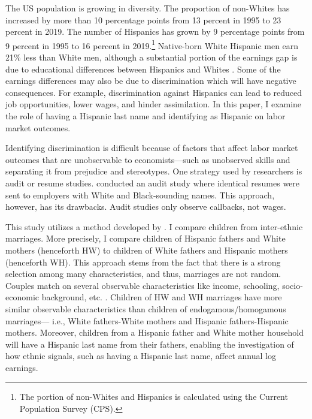 \documentclass[12pt,english]{article}
\begin{document}
The US population is growing in diversity. The proportion of non-Whites has increased by more than 10 percentage points from 13 percent in 1995 to 23 percent in 2019. The number of Hispanics has grown by 9 percentage points from 9 percent in 1995 to 16 percent in 2019.\footnote{The portion of non-Whites and Hispanics is calculated using the Current Population Survey (CPS).} Native-born White Hispanic men earn 21\% less than White men, although a substantial portion of the earnings gap is due to educational differences between Hispanics and Whites \autocite{duncan2006hispanics, duncan2018identifying, duncan2018socioeconomic}. Some of the earnings differences may also be due to discrimination which will have negative consequences. For example, discrimination against Hispanics can lead to reduced job opportunities, lower wages, and hinder assimilation. In this paper, I examine the role of having a Hispanic last name and identifying as Hispanic on labor market outcomes. 

Identifying discrimination is difficult because of factors that affect labor market outcomes that are unobservable to economists---such as unobserved skills and separating it from prejudice and stereotypes. One strategy used by researchers is audit or resume studies. \textcite{bertrand2004emily} conducted an audit study where identical resumes were sent to employers with White and Black-sounding names. This approach, however, has its drawbacks. Audit studies only observe callbacks, not wages. 

This study utilizes a method developed by \textcite{rubinstein2014pride}. I compare children from inter-ethnic marriages. More precisely, I compare children of Hispanic fathers and White mothers (henceforth HW) to children of White fathers and Hispanic mothers (henceforth  WH). This approach stems from the fact that there is a strong selection among many characteristics, and thus, marriages are not random. Couples match on several observable characteristics like income, schooling, socio-economic background, etc. \autocite{averettBetterWorseRelationship2008, averettEconomicRealityBeauty1996, beckerTheoryMarriagePart1973, beckerTheoryMarriagePart1974, beckerTreatiseFamily1993, browningCollectiveUnitaryModels2006, chiapporiFatterAttractionAnthropometric2012}. Children of HW and WH marriages have more similar observable characteristics than children of endogamous/homogamous marriages--- i.e., White fathers-White mothers and Hispanic fathers-Hispanic mothers. Moreover, children from a Hispanic father and White mother household will have a Hispanic last name from their fathers, enabling the investigation of how ethnic signals, such as having a Hispanic last name, affect annual log earnings.
\end{document}
